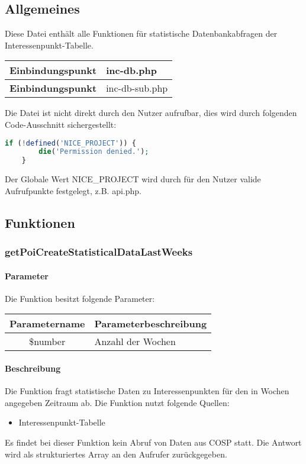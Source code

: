 \subsection{Allgemeines} Diese Datei enthält alle Funktionen für statistische Datenbankabfragen der Interessenpunkt-Tabelle.
\begin{table}[H]
	\begin{tabular}{|c|p{11cm}|}
		\hline
		\textbf{Einbindungspunkt} & inc-db.php \\ \hline
		\textbf{Einbindungspunkt} & inc-db-sub.php \\ \hline
	\end{tabular}
\end{table}
Die Datei ist nicht direkt durch den Nutzer aufrufbar, dies wird durch folgenden Code-Ausschnitt sichergestellt:
\begin{lstlisting}[language=php]
	if (!defined('NICE_PROJECT')) {
		die('Permission denied.');
	}
\end{lstlisting}
Der Globale Wert {\glqq NICE\_PROJECT\grqq} wird durch für den Nutzer valide Aufrufpunkte festgelegt, z.B. {\glqq api.php\grqq}.
\newpage
\subsection{Funktionen}
\subsubsection{getPoiCreateStatisticalDataLastWeeks}
\paragraph{Parameter} Die Funktion besitzt folgende Parameter:
\begin{table}[H]
	\begin{tabular}{|c|p{11cm}|}
		\hline
		\textbf{Parametername} & \textbf{Parameterbeschreibung} \\ \hline
		\$number & Anzahl der Wochen \\ \hline
	\end{tabular}
\end{table}
\paragraph{Beschreibung} Die Funktion fragt statistische Daten zu Interessenpunkten für den in Wochen angegeben Zeitraum ab. Die Funktion nutzt folgende Quellen:
\begin{itemize}
	\item Interessenpunkt-Tabelle
\end{itemize}
Es findet bei dieser Funktion kein Abruf von Daten aus {\glqq COSP\grqq} statt. Die Antwort wird als strukturiertes Array an den Aufrufer zurückgegeben.
